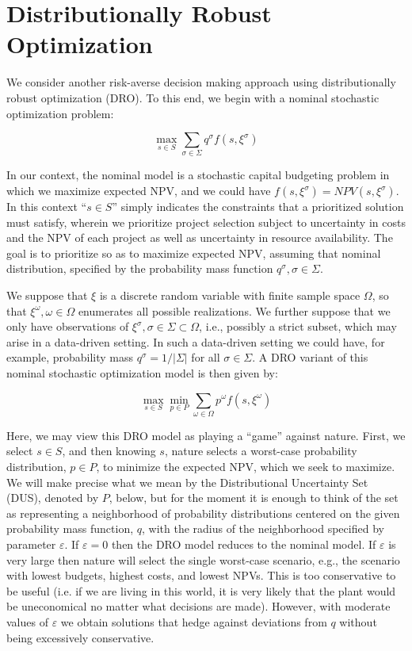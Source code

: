 \section{Distributionally Robust Optimization}
\label{sec:DROCapitalBudgeting}

We consider another risk-averse decision making approach
using distributionally robust optimization (DRO). To this end, we begin with
a nominal stochastic optimization problem:

\begin{equation}
\max_{s\in S} \sum_{\sigma\in \Sigma} q^\sigma f(s,\xi^\sigma)
\end{equation}

In our context, the nominal model is a stochastic capital budgeting problem
in which we maximize expected NPV, and we could have
$f(s,\xi^\sigma)=NPV(s,\xi^\sigma)$. In this context ``$s\in S$'' simply
indicates the constraints that a prioritized solution must satisfy, wherein
we prioritize project selection subject to uncertainty in costs and the NPV
of each project as well as uncertainty in resource availability. The goal is
to prioritize so as to maximize expected NPV, assuming that nominal distribution,
specified by the probability mass function $q^\sigma, \sigma \in \Sigma$.

We suppose that $\xi$ is a discrete random variable with finite sample space $\Omega$,
so that $\xi^\omega, \omega \in \Omega$ enumerates all possible realizations.
We further suppose that we only have observations of
$\xi^\sigma, \sigma \in \Sigma \subset \Omega$,
i.e., possibly a strict subset, which may arise in a data-driven setting. In such a
data-driven setting we could have, for example, probability mass $q^\sigma = 1/|\Sigma|$
for all $\sigma \in \Sigma$.
A DRO variant of this nominal stochastic optimization model is then given by:

\begin{equation}
\max_{s\in S} \min_{p\in P} \sum_{\omega\in \Omega} p^\omega f(s,\xi^\omega)
\end{equation}

Here, we may view this DRO model as playing a ``game'' against nature. First, we select
$s\in S$, and then knowing $s$, nature selects a worst-case probability distribution,
$p\in P$, to minimize the expected NPV, which we seek to maximize. We will make precise
what we mean by the Distributional Uncertainty Set (DUS), denoted by $P$, below, but
for the moment it is enough to think of the set as representing a neighborhood of
probability distributions centered on the given probability mass function, $q$,
with the radius of the neighborhood specified by parameter $\varepsilon$. If
$\varepsilon = 0$ then the DRO model reduces to the nominal model. If $\varepsilon$ is very
large then nature will select the single worst-case scenario, e.g., the scenario
with lowest budgets, highest costs, and lowest NPVs. This is too conservative to be useful
(i.e. if we are living in this world, it is very likely that the plant would be
uneconomical no matter what decisions are made). However, with moderate values of
$\varepsilon$ we obtain solutions that hedge against deviations from $q$ without being
excessively conservative.

